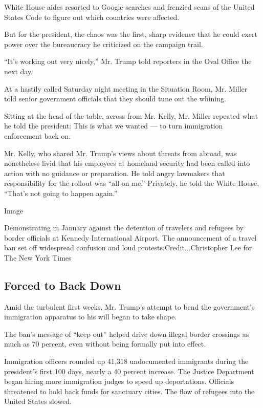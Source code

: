 White House aides resorted to Google searches and frenzied scans of the
United States Code to figure out which countries were affected.

But for the president, the chaos was the first, sharp evidence that he
could exert power over the bureaucracy he criticized on the campaign
trail.

``It's working out very nicely,'' Mr. Trump told reporters in the Oval
Office the next day.

At a hastily called Saturday night meeting in the Situation Room, Mr.
Miller told senior government officials that they should tune out the
whining.

Sitting at the head of the table, across from Mr. Kelly, Mr. Miller
repeated what he told the president: This is what we wanted --- to turn
immigration enforcement back on.

Mr. Kelly, who shared Mr. Trump's views about threats from abroad, was
nonetheless livid that his employees at homeland security had been
called into action with no guidance or preparation. He told angry
lawmakers that responsibility for the rollout was ``all on me.''
Privately, he told the White House, ``That's not going to happen
again.''

Image

Demonstrating in January against the detention of travelers and refugees
by border officials at Kennedy International Airport. The announcement
of a travel ban set off widespread confusion and loud
protests.Credit...Christopher Lee for The New York Times

\hypertarget{forced-to-back-down}{%
\subsection{Forced to Back Down}\label{forced-to-back-down}}

Amid the turbulent first weeks, Mr. Trump's attempt to bend the
government's immigration apparatus to his will began to take shape.

The ban's message of ``keep out'' helped drive down illegal border
crossings as much as 70 percent, even without being formally put into
effect.

Immigration officers rounded up 41,318 undocumented immigrants during
the president's first 100 days, nearly a 40 percent increase. The
Justice Department began hiring more immigration judges to speed up
deportations. Officials threatened to hold back funds for sanctuary
cities. The flow of refugees into the United States slowed.

